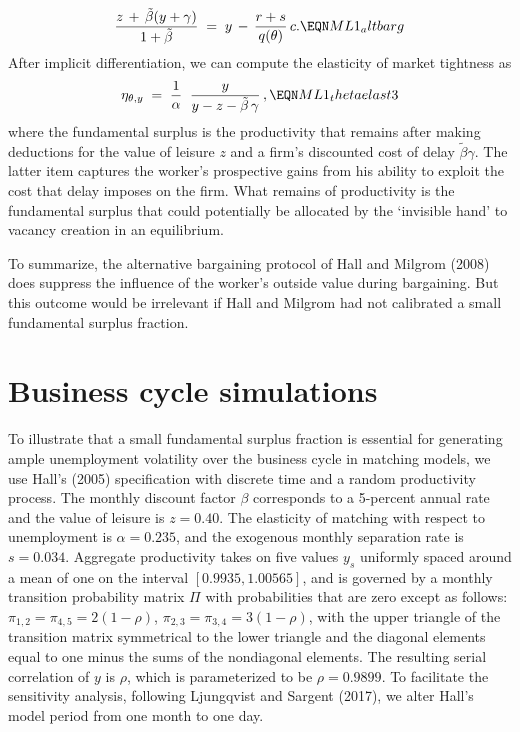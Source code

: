 $$
{ z\,+\,\tilde \beta(y+\gamma) \over 1+\tilde \beta }  \;=\;
y \,-\, {r + s \over q(\theta)} \, c .       \EQN ML1_altbarg
$$
After implicit differentiation,
we can compute the elasticity of market tightness as
$$
\eta_{\theta,y}
\;=\; {1 \over \alpha} \; \;
      {y \over y-z- \tilde \beta \,\gamma} \,,  \EQN ML1_thetaelast3
$$
where the fundamental surplus is the productivity
that remains after making deductions for the value of leisure $z$
and a firm's discounted cost of delay $\tilde \beta \gamma$.
The latter item
captures the worker's prospective gains from his
 ability to exploit the
cost that delay imposes on the firm.  What remains of productivity is the
fundamental surplus that could potentially be allocated by the
`invisible hand'  to  vacancy creation in an equilibrium.

To summarize, the alternative bargaining
protocol of Hall and Milgrom (2008) does suppress the influence of the
worker's outside value during bargaining. But
this outcome would be irrelevant if  Hall and Milgrom had  not
calibrated a small fundamental surplus fraction.







\section{Business cycle simulations}\label{sec:FS_simulations}%
To illustrate that a small fundamental surplus fraction is essential for
generating ample unemployment volatility over the business cycle in
matching models, we use  Hall's (2005) specification
with discrete time and a  random productivity process.
The monthly discount factor $\beta$ corresponds to a 5-percent annual
rate and the value of leisure is $z=0.40$. The elasticity of
matching with respect to unemployment is $\alpha=0.235$, and the
exogenous monthly separation rate is $s=0.034$. Aggregate productivity
takes on five  values $y_s$ uniformly spaced around a mean of
one on the interval $[0.9935, 1.00565]$, and is governed by
a monthly transition probability matrix $\Pi$ with probabilities
that are zero except as follows: $\pi_{1,2}=\pi_{4,5}=2(1-\rho)$,
$\pi_{2,3}=\pi_{3,4}=3(1-\rho)$, with the upper triangle of the
transition matrix symmetrical to the lower triangle and the
diagonal elements equal to one minus the sums of the nondiagonal
elements. The resulting serial correlation of $y$ is $\rho$, which
is parameterized to be $\rho=0.9899$.
To facilitate the
sensitivity analysis, following Ljungqvist and Sargent (2017), we alter
Hall's model period from one month to one day.




